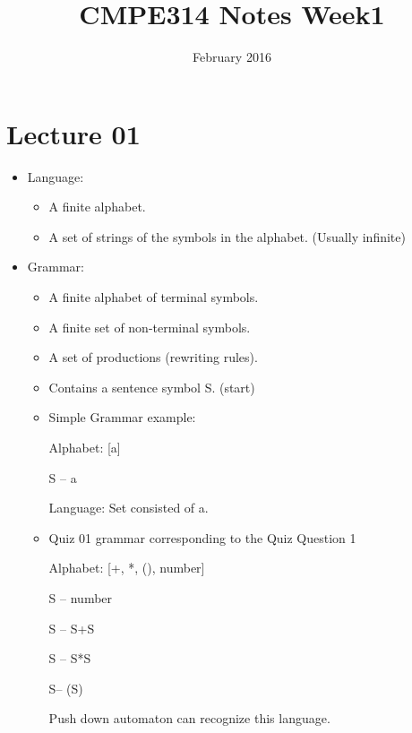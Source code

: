 \documentclass{article}
\title{CMPE314 Notes Week1}
\date{February 2016}
\begin{document}
\maketitle

\section{Lecture 01}
    
\begin{itemize}

\item  Language: 
    \begin{itemize}
        \item A finite alphabet.
        \item A set of strings of the symbols in the alphabet. (Usually infinite)

    \end{itemize}

\item Grammar:
    \begin{itemize}
        \item A finite alphabet of terminal symbols.
        \item A finite set of non-terminal symbols.
        \item  A set of productions (rewriting rules).
        \item Contains a sentence symbol S. (start)
        \item Simple Grammar example: 
    
        Alphabet: [a]
    
        S  --  a
    
        Language: Set consisted of a.
        
        \item Quiz 01 grammar corresponding to the Quiz Question 1
        
        Alphabet: [+, *, (), number]
        
        S -- number
        
        S -- S+S 
        
        S -- S*S
        
        S-- (S)
        
        Push down automaton can recognize this language.
        
        
        \end{itemize}
        
\end{itemize}
\end{document}
